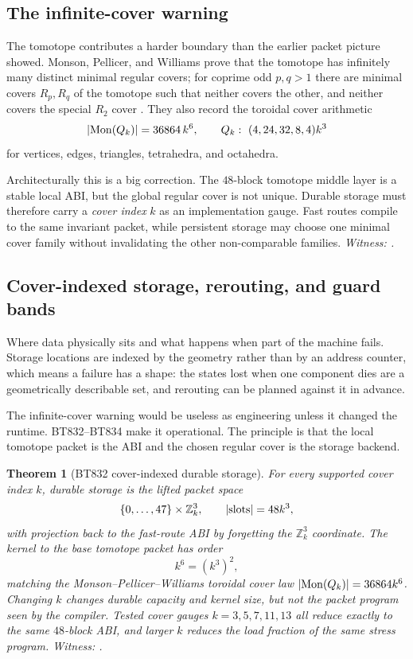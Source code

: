 \documentclass[11pt]{article}
\newtheorem{theorem}{Theorem}[section]
\begin{document}
\subsection{The infinite-cover warning}

The tomotope contributes a harder boundary than the earlier packet
picture showed.  Monson, Pellicer, and Williams prove that the
tomotope has infinitely many distinct minimal regular covers; for
coprime odd $p,q>1$ there are minimal covers $R_p,R_q$ of the
tomotope such that neither covers the other, and neither covers the
special $R_2$ cover \cite{tomotope}.  They also record the toroidal
cover arithmetic
\[
|{\rm Mon}(Q_k)|=36864\,k^6,\qquad
Q_k:\ (4,24,32,8,4)k^3
\]
for vertices, edges, triangles, tetrahedra, and octahedra.

Architecturally this is a big correction.  The $48$-block tomotope
middle layer is a stable local ABI, but the global regular cover is
not unique.  Durable storage must therefore carry a \emph{cover
index} $k$ as an implementation gauge.  Fast routes compile to the
same invariant packet, while persistent storage may choose one minimal
cover family without invalidating the other non-comparable families.
\emph{Witness: .}

\subsection{Cover-indexed storage, rerouting, and guard bands}

\begin{plainbox}
Where data physically sits and what happens when part of the machine fails.
Storage locations are indexed by the geometry rather than by an address counter, which
means a failure has a shape: the states lost when one component dies are a geometrically
describable set, and rerouting can be planned against it in advance.
\end{plainbox}


The infinite-cover warning would be useless as engineering unless it
changed the runtime.  BT832--BT834 make it operational.  The principle
is that the local tomotope packet is the ABI and the chosen regular
cover is the storage backend.

\begin{theorem}[BT832 cover-indexed durable storage]
For every supported cover index $k$, durable storage is the lifted
packet space
\[
\{0,\ldots,47\}\times \mathbb{Z}_k^3,
\qquad
|\hbox{slots}|=48k^3,
\]
with projection back to the fast-route ABI by forgetting the
$\mathbb{Z}_k^3$ coordinate.  The kernel to the base tomotope packet has
order
\[
k^6=(k^3)^2,
\]
matching the Monson--Pellicer--Williams toroidal cover law
$|{\rm Mon}(Q_k)|=36864k^6$.  Changing $k$ changes durable capacity and
kernel size, but not the packet program seen by the compiler.  Tested
cover gauges $k=3,5,7,11,13$ all reduce exactly to the same $48$-block
ABI, and larger $k$ reduces the load fraction of the same stress
program.
\emph{Witness: .}
\end{theorem}
\end{document}
